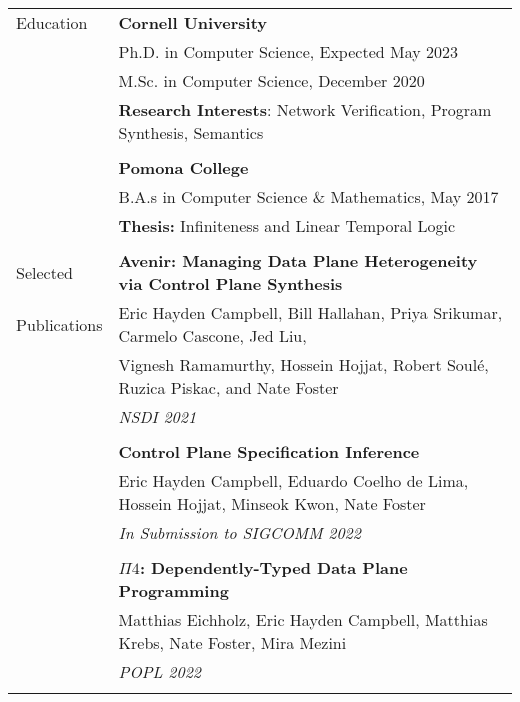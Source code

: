 \documentclass[letterpaper,10pt,oneside]{article}
\begin{document}
\noindent
\begin{tabular}{@{} l l}
  \Large{Education} 
  & \textbf{Cornell University} \\
  
  & Ph.D. in Computer Science, Expected May 2023 \\

  
  & M.Sc. in Computer Science, December 2020 \\
  

  & \textbf{Research Interests}: Network Verification, Program Synthesis, Semantics \\
  & \\


  & \textbf{Pomona College} \\

  & B.A.s in Computer Science \& Mathematics, May 2017 \\

  & \textbf{Thesis:} Infiniteness and Linear Temporal Logic \\
  & \\





  \Large{Selected}
  & \textbf{Avenir: Managing Data Plane Heterogeneity via Control Plane Synthesis}\\
  \Large{Publications}
  & Eric Hayden Campbell, Bill Hallahan, Priya Srikumar, Carmelo Cascone, Jed Liu, \\ & Vignesh Ramamurthy, Hossein Hojjat, Robert  Soul\'{e}, Ruzica Piskac,  and  Nate Foster\\
  & \textit{NSDI 2021} \\
  &\\

  & \textbf{Control Plane Specification Inference} \\
  & Eric Hayden Campbell, Eduardo Coelho de Lima, Hossein Hojjat, Minseok Kwon, Nate Foster \\
  & \textit{In Submission to SIGCOMM 2022} \\
  & \\

  & \textbf{$\Pi4$: Dependently-Typed Data Plane Programming} \\
  & Matthias Eichholz, Eric Hayden Campbell, Matthias Krebs, Nate Foster, Mira Mezini \\
  & \textit{POPL 2022}\\ & \\


\end{tabular}
\end{document}
